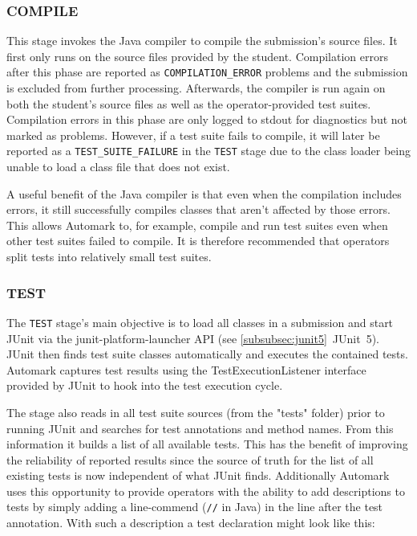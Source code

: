 \documentclass[12pt,a4paper,oneside]{report}
\begin{document}
	\subsubsection{COMPILE}
	This stage invokes the Java compiler to compile the submission's source files. It first only runs on the source files provided by the student. Compilation errors after this phase are reported as \lstinline|COMPILATION_ERROR| problems and the submission is excluded from further processing. Afterwards, the compiler is run again on both the student's source files as well as the operator-provided test suites. Compilation errors in this phase are only logged to stdout for diagnostics but not marked as problems. However, if a test suite fails to compile, it will later be reported as a \lstinline|TEST_SUITE_FAILURE| in the \lstinline|TEST| stage due to the class loader being unable to load a class file that does not exist.

	\pagebreak
	A useful benefit of the Java compiler is that even when the compilation includes errors, it still successfully compiles classes that aren't affected by those errors. This allows Automark to, for example, compile and run test suites even when other test suites failed to compile. It is therefore recommended that operators split tests into relatively small test suites.

	\subsubsection{TEST}
	The \lstinline|TEST| stage's main objective is to load all classes in a submission and start JUnit via the junit-platform-launcher API (see \ref{subsubsec:junit5}~JUnit~5). JUnit then finds test suite classes automatically and executes the contained tests. Automark captures test results using the TestExecutionListener interface provided by JUnit to hook into the test execution cycle.

	The stage also reads in all test suite sources (from the "tests" folder) prior to running JUnit and searches for test annotations and method names. From this information it builds a list of all available tests. This has the benefit of improving the reliability of reported results since the source of truth for the list of all existing tests is now independent of what JUnit finds. Additionally Automark uses this opportunity to provide operators with the ability to add descriptions to tests by simply adding a line-commend (\lstinline|//| in Java) in the line after the test annotation. With such a description a test declaration might look like this:
\end{document}
